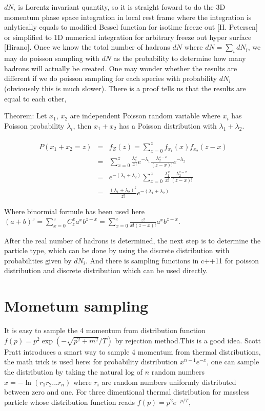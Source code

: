 \documentclass[11pt, oneside]{article}   	%
\begin{document}
$dN_{i}$ is Lorentz invariant quantity, so it is straight foward
to do the 3D momentum phase space integration in local rest frame
where the integration is anlytically equals to modified Bessel function
for isotime freeze out {[}H. Petersen{]} or simplified to 1D numerical
integration for arbitrary freeze out hyper surface {[}Hirano{]}. Once
we know the total number of hadrons $dN$ where $dN=\sum_{i}dN_{i}$,
we may do poisson sampling with $dN$ as the probability to determine
how many hadrons will actually be created. One may wonder whether
the results are different if we do poisson sampling for each species
with probability $dN_{i}$ (obviousely this is much slower). There
is a proof tells us that the results are equal to each other,

Theorem: Let $x_{1}$, $x_{2}$ are independent Poisson random variable
where $x_{i}$ has Poisson probability $\lambda_{i}$, then $x_{1}+x_{2}$
has a Poisson distribution with $\lambda_{1}+\lambda_{2}$.

\begin{eqnarray*}
\\
P(x_{1}+x_{2}=z) & = & f_{Z}(z)=\sum_{x=0}^{z}f_{x_{1}}(x)f_{x_{2}}(z-x)\\
 & = & \sum_{x=0}^{z}\frac{\lambda_{1}^{x}}{x!}e^{-\lambda_{1}}\frac{\lambda_{2}^{z-x}}{(z-x)!}e^{-\lambda_{2}}\\
 & = & e^{-(\lambda_{1}+\lambda_{2})}\sum_{x=0}^{z}\frac{\lambda_{1}^{x}}{x!}\frac{\lambda_{2}^{z-x}}{(z-x)!}\\
 & = & \frac{(\lambda_{1}+\lambda_{2})^{z}}{z!}e^{-(\lambda_{1}+\lambda_{2})}
\end{eqnarray*}


Where binormial formule has been used here $(a+b)^{z}=\sum_{x=0}^{z}C_{z}^{x}a^{x}b^{z-x}=\sum_{x=0}^{z}\frac{z!}{x!(z-x)!}a^{x}b^{z-x}$.

After the real number of hadrons is determined, the next step is to
determine the particle type, which can be done by using the discrete
distribution with probabilities given by $dN_{i}$. And there is sampling
functions in c++11 for poisson distribution and discrete distribution
which can be used directly. 


\section{Mometum sampling}

It is easy to sample the 4 momentum from distribution function $f(p)=p^{2}\exp(-\sqrt{p^{2}+m^{2}}/T)$
by rejection method.This is a good idea. Scott Pratt introduces a
smart way to sample 4 momentum from thermal distributions, the math
trick is used here: for probability distribution $x^{n-1}e^{-x}$,
one can sample the distribution by taking the natural log of $n$
random numbers $x=-\ln(r_{1}r_{2}...r_{n})$ where $r_{i}$ are random
numbers uniformly distributed between zero and one. For three dimentional
thermal distribution for massless particle whose distribution function
reads $f(p)=p^{2}e^{-p/T}$, 
\end{document}
